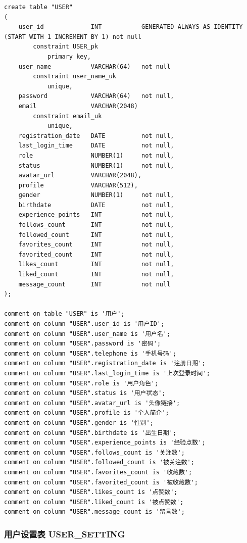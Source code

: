 \begin{verbatim}
create table "USER"
(
    user_id             INT           GENERATED ALWAYS AS IDENTITY (START WITH 1 INCREMENT BY 1) not null
        constraint USER_pk
            primary key,
    user_name           VARCHAR(64)   not null
        constraint user_name_uk
            unique,
    password            VARCHAR(64)   not null,
    email               VARCHAR(2048)
        constraint email_uk
            unique,
    registration_date   DATE          not null,
    last_login_time     DATE          not null,
    role                NUMBER(1)     not null,
    status              NUMBER(1)     not null,
    avatar_url          VARCHAR(2048),
    profile             VARCHAR(512),
    gender              NUMBER(1)     not null,
    birthdate           DATE          not null,
    experience_points   INT           not null,
    follows_count       INT           not null,
    followed_count      INT           not null,
    favorites_count     INT           not null,
    favorited_count     INT           not null,
    likes_count         INT           not null,
    liked_count         INT           not null,
    message_count       INT           not null
);

comment on table "USER" is '用户';
comment on column "USER".user_id is '用户ID';
comment on column "USER".user_name is '用户名';
comment on column "USER".password is '密码';
comment on column "USER".telephone is '手机号码';
comment on column "USER".registration_date is '注册日期';
comment on column "USER".last_login_time is '上次登录时间';
comment on column "USER".role is '用户角色';
comment on column "USER".status is '用户状态';
comment on column "USER".avatar_url is '头像链接';
comment on column "USER".profile is '个人简介';
comment on column "USER".gender is '性别';
comment on column "USER".birthdate is '出生日期';
comment on column "USER".experience_points is '经验点数';
comment on column "USER".follows_count is '关注数';
comment on column "USER".followed_count is '被关注数';
comment on column "USER".favorites_count is '收藏数';
comment on column "USER".favorited_count is '被收藏数';
comment on column "USER".likes_count is '点赞数';
comment on column "USER".liked_count is '被点赞数';
comment on column "USER".message_count is '留言数';
\end{verbatim}

\subsubsection{用户设置表 USER\_SETTING}

